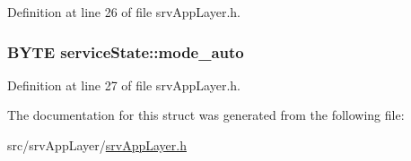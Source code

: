 Definition at line 26 of file srvAppLayer.h.

\hypertarget{structserviceState_a735dde453a714b0f2fcd60521df2699f}{
\subsubsection[{mode\_\-auto}]{\setlength{\rightskip}{0pt plus 5cm}BYTE {\bf serviceState::mode\_\-auto}}}
\label{db/d35/structserviceState_a735dde453a714b0f2fcd60521df2699f}


Definition at line 27 of file srvAppLayer.h.



The documentation for this struct was generated from the following file:\begin{DoxyCompactItemize}
\item 
src/srvAppLayer/\hyperlink{srvAppLayer_8h}{srvAppLayer.h}\end{DoxyCompactItemize}
